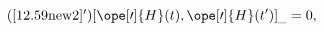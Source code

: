 \begin{equation}	\tag{\ref{12.59new2}$^{\prime}$}
				\label{12.59new2'}
[ \ope[\prime]{H}(t) , \ope[\prime]{H}(t') ]_{\_} = 0,
	\end{equation}

